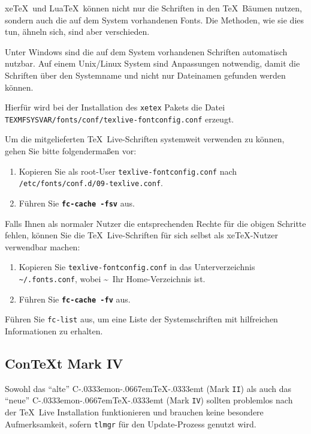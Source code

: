 \documentclass[12pt,ngerman,a4paper,fullparskip]{scrreprt}
\newcommand{\TL}{\TeX\ Live\xspace}
\newcommand{\acro}[1]{\texttt{#1}}
\newcommand{\code}[1]{\texttt{#1}}
\newcommand{\filename}[1]{\texttt{#1}}
\newcommand{\dirname}[1]{\texttt{#1}}
\newcommand{\Ucom}[1]{\textbf{\texttt{#1}}}
\newcommand\ConTeXt{C\kern-.0333emon\-\kern-.0667em\TeX\kern-.0333emt}
\providecommand*{\XeTeX}{xe\TeX\xspace}
\begin{document}
\XeTeX\  und Lua\TeX\ können nicht nur die Schriften in den \TeX\ Bäumen nutzen, sondern auch die auf dem System vorhandenen Fonts. Die Methoden, wie sie dies tun, ähneln sich, sind aber verschieden.

Unter Windows sind die auf dem System vorhandenen Schriften automatisch nutzbar. Auf einem Unix/Linux System sind Anpassungen notwendig, damit die Schriften über den Systemname und nicht nur Dateinamen gefunden werden können.

Hierfür wird bei der Installation des \filename{xetex} Pakets die Datei \newline  \filename{TEXMFSYSVAR/fonts/conf/texlive-fontconfig.conf}
erzeugt.

Um die mitgelieferten \TL-Schriften systemweit verwenden zu können,
gehen Sie bitte folgendermaßen vor:

\begin{enumerate}
\item Kopieren Sie als root-User \filename{texlive-fontconfig.conf} nach \newline
\dirname{/etc/fonts/conf.d/09-texlive.conf}.
\item Führen Sie \Ucom{fc-cache -fsv} aus. 
\end{enumerate}

\noindent Falls Ihnen als normaler Nutzer die entsprechenden Rechte für die
obigen Schritte fehlen, können Sie die \TL-Schriften für sich selbst
als \XeTeX-Nutzer verwendbar machen:

\begin{enumerate}
\item Kopieren Sie \filename{texlive-fontconfig.conf} in das Unterverzeichnis
      \filename{\textasciitilde/.fonts.conf}, wobei \textasciitilde\ Ihr Home-Verzeichnis ist.
\item Führen Sie \Ucom{fc-cache -fv} aus.
\end{enumerate}

Führen Sie \code{fc-list} aus, um eine Liste der Systemschriften mit hilfreichen Informationen zu erhalten.

\subsection{Con\TeX t Mark IV}
\label{sec:context-mkiv}

Sowohl das \enquote{alte} \ConTeXt{} (Mark \acro{II}) als auch das \enquote{neue} \ConTeXt{} (Mark \acro{IV}) sollten problemlos nach der \TL{} Installation funktionieren und brauchen keine besondere Aufmerksamkeit, sofern \verb+tlmgr+ für den Update-Prozess genutzt wird.
\end{document}
